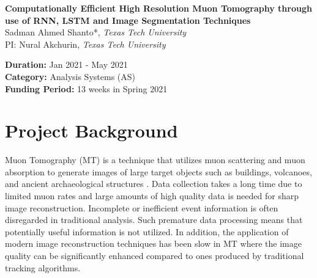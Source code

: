 \documentclass[10pt]{article}
\begin{document}
\begin{center}
    \Large{\textbf{Computationally Efficient High Resolution Muon Tomography through use of RNN, LSTM and Image Segmentation Techniques}} \\ 
    \vspace{1.5mm}
    \large{Sadman Ahmed Shanto*, \textit{Texas Tech University}} \\
    \large{PI: Nural Akchurin, \textit{Texas Tech University}}
\end{center}


\flushleft
\large{
\textbf{Duration:} Jan 2021 - May 2021 \\
\textbf{Category:} Analysis Systems (AS) \\
\textbf{Funding Period:} 13 weeks in Spring 2021}

\section{Project Background}


Muon Tomography (MT) is a technique that utilizes muon scattering and muon absorption to generate images of large target objects such as buildings, volcanoes, and ancient archaeological structures \cite{paper, paper1, paper2, paper3, paper4, paper5}. Data collection takes a long time due to limited muon rates and large amounts of high quality data is needed for sharp image reconstruction. Incomplete or inefficient event information is often disregarded in traditional analysis. Such premature data processing means that potentially useful information is not utilized. In addition, the application of modern image reconstruction techniques has been slow in MT where the image quality can be significantly enhanced compared to ones produced by traditional tracking algorithms.
\end{document}
